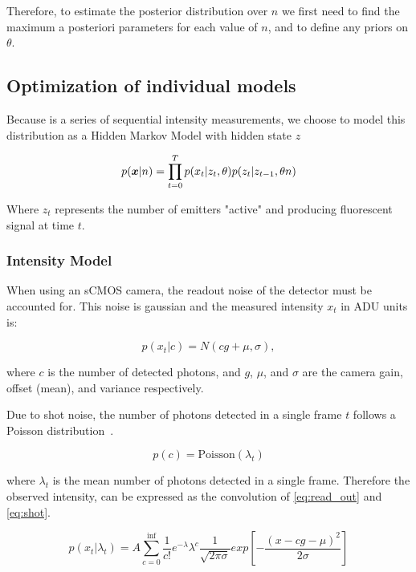 Therefore, to estimate the posterior distribution over $n$ we first need to 
find the maximum a posteriori parameters for each value of $n$,
and to define any priors on $\theta$.

\subsection{Optimization of individual models}

Because \trace is a series of sequential intensity measurements, 
we choose to model this distribution as a Hidden Markov Model with hidden state $z$

\begin{equation}
  p(\bm{x}| n) = \prod_{t=0}^{T} p(x_{t} | z_{t}, \theta) p(z_{t} | z_{t-1}, \theta n)
  \label{eq:method:base}
\end{equation}

Where $z_{t}$ represents the number of emitters "active" and producing 
fluorescent signal at time $t$.

\subsubsection{Intensity Model}
When using an sCMOS camera, the readout noise of the detector must be accounted for.
  This noise is gaussian and the measured intensity $x_{t}$ in ADU units is:

  \begin{equation}
    p(x_{t}|c) = N(cg + \mu, \sigma),
    \label{eq:read_out}
  \end{equation}

  where $c$ is the number of detected photons, and $g$, $\mu$, and $\sigma$ are the
  camera gain, offset (mean), and variance respectively.

Due to shot noise, the number of photons detected in a single frame $t$ follows a
  Poisson distribution~\cite{mehta_poisson_2016}.

  \begin{equation}
    p(c) = \text{Poisson}(\lambda_{t})
    \label{eq:shot}
  \end{equation}

  where $\lambda_{t}$ is the mean number of photons detected in a single frame.
  Therefore the observed intensity, can be expressed as the convolution of 
  \eqref{eq:read_out} and \eqref{eq:shot}.

  \begin{equation*}
    p(x_{t}| \lambda_{t}) = A \sum_{c=0}^{\text{inf}}\frac{1}{c!} e^{-\lambda} \lambda^{c}
    \frac{1}{\sqrt{2\pi\sigma}}
    exp \left[ - \frac{(x - cg - \mu)^2}{2\sigma}\right]
  \end{equation*}

